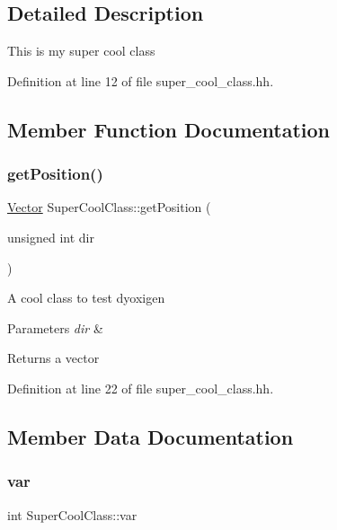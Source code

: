 \subsection{Detailed Description}
This is my super cool class 

Definition at line 12 of file super\+\_\+cool\+\_\+class.\+hh.



\subsection{Member Function Documentation}
\mbox{\label{class_super_cool_class_a761c470f000de1a101a855de2d49d195}} 
\subsubsection{\texorpdfstring{get\+Position()}{getPosition()}}
{\footnotesize\ttfamily \hyperlink{struct_vector}{Vector} Super\+Cool\+Class\+::get\+Position (\begin{DoxyParamCaption}\item[{unsigned int}]{dir }\end{DoxyParamCaption})\hspace{0.3cm}{\ttfamily [inline]}}

A cool class to test dyoxigen


\begin{DoxyParams}{Parameters}
{\em dir} & \\
\hline
\end{DoxyParams}
\begin{DoxyReturn}{Returns}
a vector 
\end{DoxyReturn}


Definition at line 22 of file super\+\_\+cool\+\_\+class.\+hh.



\subsection{Member Data Documentation}
\mbox{\label{class_super_cool_class_a0264bf7dc5bfe0057907102b2b5b767d}} 
\subsubsection{\texorpdfstring{var}{var}}
{\footnotesize\ttfamily int Super\+Cool\+Class\+::var\hspace{0.3cm}{\ttfamily [protected]}}



